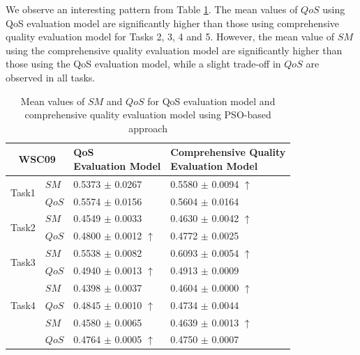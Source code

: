 \documentclass{llncs}
\begin{document}
We observe an interesting pattern from Table \ref{decisionTable}. The mean values of $QoS$ using QoS evaluation model are significantly higher than those using comprehensive quality evaluation model for Tasks 2, 3, 4 and 5. However, the mean value of $SM$ using the comprehensive quality evaluation model are significantly higher than those using the QoS evaluation model, while a slight trade-off in $QoS$ are observed in all tasks.

\begin{table}[]
\footnotesize
\centering
\caption{Mean values of $SM$ and $QoS$ for QoS evaluation model and comprehensive quality evaluation model using PSO-based approach}
\label{decisionTable}
\begin{tabular}{c|l|l|l}
\hline
\multicolumn{2}{c|}{WSC09}              & \shortstack{QoS \\ Evaluation Model}         &\shortstack{Comprehensive Quality \\ Evaluation Model} \\ \hline
\multirow{2}{*}{Task1}  &$SM$   &0.5373 $\pm$ 0.0267               &0.5580 $\pm$ 0.0094 $\uparrow$ \\ \cline{2-4}
                        &$QoS$  &0.5574 $\pm$ 0.0156               &0.5604 $\pm$ 0.0164                          \\ \hline
\multirow{2}{*}{Task2}  &$SM$   &0.4549 $\pm$ 0.0033               &0.4630 $\pm$ 0.0042 $\uparrow$ \\ \cline{2-4} 
                        &$QoS$  &0.4800 $\pm$ 0.0012 $\uparrow$    &0.4772 $\pm$ 0.0025 \\ \hline
\multirow{2}{*}{Task3}  &$SM$   &0.5538 $\pm$ 0.0082               &0.6093 $\pm$ 0.0054 $\uparrow$   \\ \cline{2-4} 
                        &$QoS$  &0.4940 $\pm$ 0.0013 $\uparrow$    &0.4913 $\pm$ 0.0009            \\ \hline
\multirow{3}{*}{Task4}  &$SM$   &0.4398 $\pm$ 0.0037               &0.4604 $\pm$ 0.0000 $\uparrow$ \\ \cline{2-4} 
                        &$QoS$  &0.4845 $\pm$ 0.0010 $\uparrow$    &0.4734 $\pm$ 0.0044  \\ \hline
\multirow{3}{*}{Task5}  &$SM$   &0.4580 $\pm$ 0.0065               &0.4639 $\pm$ 0.0013 $\uparrow$           \\ \cline{2-4} 
                        &$QoS$  &0.4764 $\pm$ 0.0005 $\uparrow$    &0.4750 $\pm$ 0.0007  \\ \hline                                                   
\end{tabular}
\end{table}
\end{document}
